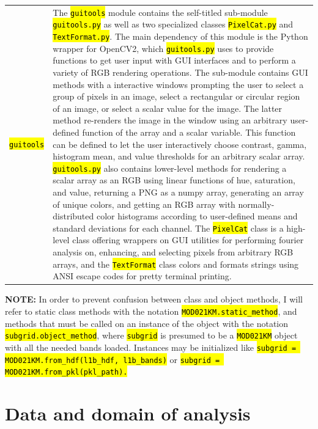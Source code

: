 \documentclass[12pt]{article}
\newcommand{\hltexttt}[1]{\texttt{\hl{#1}}}
\begin{document}
\begin{table}[h]
\begin{tabular}{ l p{14cm}}
        \hltexttt{guitools} &
        The \hltexttt{guitools} module contains the self-titled sub-module \hltexttt{guitools.py} as well as two specialized classes \hltexttt{PixelCat.py} and \hltexttt{TextFormat.py}. The main dependency of this module is the Python wrapper for OpenCV2, which \hltexttt{guitools.py} uses to provide functions to get user input with GUI interfaces and to perform a variety of RGB rendering operations. The sub-module contains GUI methods with a interactive windows prompting the user to select a group of pixels in an image, select a rectangular or circular region of an image, or select a scalar value for the image. The latter method re-renders the image in the window using an arbitrary user-defined function of the array and a scalar variable. This function can be defined to let the user interactively choose contrast, gamma, histogram mean, and value thresholds for an arbitrary scalar array. \hltexttt{guitools.py} also contains lower-level methods for rendering a scalar array as an RGB using linear functions of hue, saturation, and value, returning a PNG as a numpy array, generating an array of unique colors, and getting an RGB array with normally-distributed color histograms according to user-defined means and standard deviations for each channel. The \hltexttt{PixelCat} class is a high-level class offering wrappers on GUI utilities for performing fourier analysis on, enhancing, and selecting pixels from arbitrary RGB arrays, and the \hltexttt{TextFormat} class colors and formats strings using ANSI escape codes for pretty terminal printing.

    \end{tabular}
\end{table}

\clearpage

\noindent
\textbf{NOTE:} In order to prevent confusion between class and object methods, I will refer to static class methods with the notation \hltexttt{MOD021KM.static\_method}, and methods that must be called on an instance of the object with the notation \hltexttt{subgrid.object\_method}, where \hltexttt{subgrid} is presumed to be a \hltexttt{MOD021KM} object with all the needed bands loaded. Instances may be initialized like \hltexttt{subgrid = MOD021KM.from\_hdf(l1b\_hdf, l1b\_bands)} or \hltexttt{subgrid = MOD021KM.from\_pkl(pkl\_path).}

\section{Data and domain of analysis}\label{data_domain}
\end{document}
